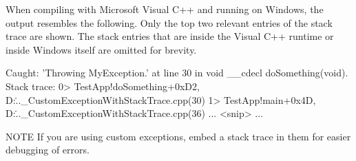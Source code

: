 When compiling with Microsoft Visual C++ and running on Windows, the output resembles the following. Only the top two relevant entries of the stack trace are shown. The stack entries that are inside the Visual C++ runtime or inside Windows itself are omitted for brevity.

\begin{shell}
Caught: 'Throwing MyException.' at line 30 in void __cdecl doSomething(void).
  Stack trace:
    0> TestApp!doSomething+0xD2, D:\..._CustomExceptionWithStackTrace.cpp(30)
    1> TestApp!main+0x4D, D:\..._CustomExceptionWithStackTrace.cpp(36)
    ... <snip> ...
\end{shell}

\begin{myNotic}{NOTE}
If you are using custom exceptions, embed a stack trace in them for easier debugging of errors.
\end{myNotic}













